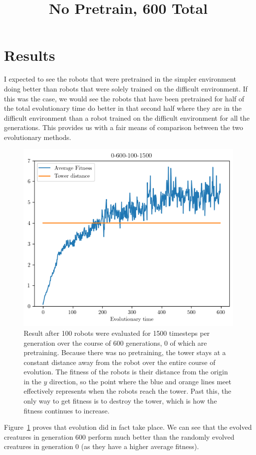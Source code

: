 \documentclass[12pt, a4paper]{article}
\begin{document}
\section{Results}
I expected to see the robots that were pretrained in the simpler environment doing better than robots that were solely trained on the difficult environment. If this was the case, we would see the robots that have been pretrained for half of the total evolutionary time do better in that second half where they are in the difficult environment than a robot trained on the difficult environment for all the generations. This provides us with a fair means of comparison between the two evolutionary methods. 
\begin{figure}[h]
	\centering
	\title{No Pretrain, 600 Total}
	\includegraphics[width=1\textwidth]{0-600-100-1500/0-600-100-1500.png}
	\caption{Result after 100 robots were evaluated for 1500 timesteps per generation over the course of 600 generations, 0 of which are pretraining. Because there was no pretraining, the tower stays at a constant distance away from the robot over the entire course of evolution. The fitness of the robots is their distance from the origin in the $y$ direction, so the point where the blue and orange lines meet effectively represents when the robots reach the tower. Past this, the only way to get fitness is to destroy the tower, which is how the fitness continues to increase.}
	\label{nopretrain}
\end{figure}

Figure~\ref{nopretrain} proves that evolution did in fact take place. We can see that the evolved creatures in generation 600 perform much better than the randomly evolved creatures in generation 0 (as they have a higher average fitness).
\end{document}
